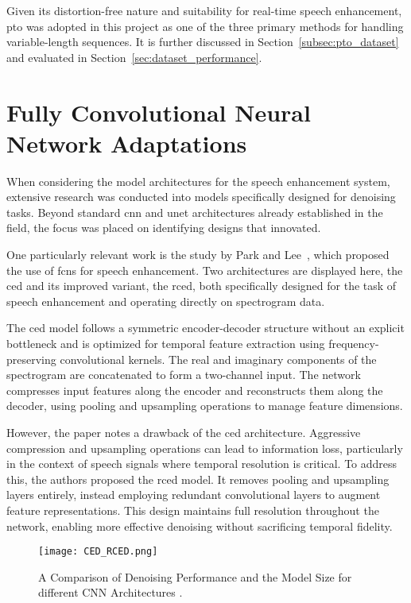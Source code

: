 Given its distortion-free nature and suitability for real-time speech enhancement, \gls{pto} was adopted in this project as one of the three primary methods for handling variable-length sequences. It is further discussed in Section~\ref{subsec:pto_dataset} and evaluated in Section~\ref{sec:dataset_performance}.

\section{Fully Convolutional Neural Network Adaptations}
\label{sec:fcns}

When considering the model architectures for the speech enhancement system, extensive research was conducted into models specifically designed for denoising tasks. Beyond standard \gls{cnn} and \gls{unet} architectures already established in the field, the focus was placed on identifying designs that innovated.

One particularly relevant work is the study by Park and Lee~\cite{park2017acoustic}, which proposed the use of \gls{fcn}s for speech enhancement. Two architectures are displayed here, the \gls{ced} and its improved variant, the \gls{rced}, both specifically designed for the task of speech enhancement and operating directly on spectrogram data.

The \gls{ced} model follows a symmetric encoder-decoder structure without an explicit bottleneck and is optimized for temporal feature extraction using frequency-preserving convolutional kernels. The real and imaginary components of the spectrogram are concatenated to form a two-channel input. The network compresses input features along the encoder and reconstructs them along the decoder, using pooling and upsampling operations to manage feature dimensions.

However, the paper notes a drawback of the \gls{ced} architecture. Aggressive compression and upsampling operations can lead to information loss, particularly in the context of speech signals where temporal resolution is critical. To address this, the authors proposed the \gls{rced} model. It removes pooling and upsampling layers entirely, instead employing redundant convolutional layers to augment feature representations. This design maintains full resolution throughout the network, enabling more effective denoising without sacrificing temporal fidelity.

\begin{figure}[H]
    \centering
    \texttt{[image: CED\_RCED.png]}
    \caption{A Comparison of Denoising Performance and the
    Model Size for different CNN Architectures \cite{park2017acoustic}.}
    \label{fig:fcns_results}
\end{figure}

